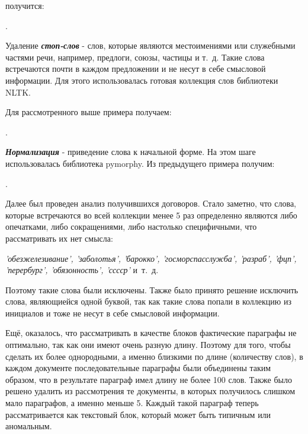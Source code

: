 \documentclass[12pt]{article}
\begin{document}
\vspace{13pt}
\noindent получится:

\vspace{13pt}
.

 \vspace{13pt}

Удаление \textbf{\textit{стоп-слов}} - слов, которые являются местоимениями или служебными частями речи, например, предлоги, союзы, частицы и т.~д. Такие слова встречаются почти в каждом предложении и не несут в себе смысловой информации. Для этого использовалась готовая коллекция слов библиотеки NLTK. 

Для рассмотренного выше примера получаем:

\vspace{13pt}
.
\vspace{13pt}

\textbf{\textit{Нормализация}} - приведение слова к начальной форме. На этом шаге использовалась библиотека pymorphy. Из предыдущего примера получим:

\vspace{13pt}
.
\vspace{13pt}

Далее был проведен анализ получившихся договоров. Стало заметно, что слова, которые встречаются во всей коллекции менее 5 раз определенно являются либо опечатками, либо сокращениями, либо настолько специфичными, что рассматривать их нет смысла: 

\vspace{10pt}
\noindent\textit{'обезжелезивание', 'заболотья', 'барокко', 'госморспасслужба', \linebreak 'разраб', 'фцп', 'перербург', 'обязонность', 'сссср'} и~т.~д.
\vspace{10pt}

Поэтому такие слова были исключены. Также было принято решение исключить слова, являющиейся одной буквой, так как такие слова попали в коллекцию из инициалов и тоже не несут в себе смысловой информации.

Ещё, оказалось, что рассматривать в качестве блоков фактические параграфы не оптимально, так как они имеют очень разную длину. Поэтому для того, чтобы сделать их более однородными, а именно близкими по длине (количеству слов), в каждом документе последовательные параграфы были объединены таким образом, что в результате параграф имел длину не более 100 слов. Также было решено удалить из рассмотрения те документы, в которых получилось слишком мало параграфов, а именно меньше 5. Каждый такой параграф теперь рассматривается как текстовый блок, который может быть типичным или аномальным. 
\end{document}
